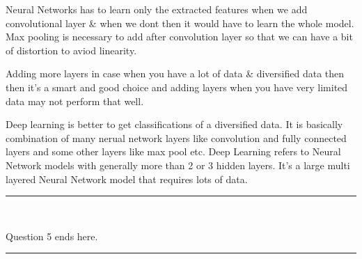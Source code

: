 \documentclass[paper=a4, fontsize=11pt]{scrartcl} %
\numberwithin{equation}{section} %
\numberwithin{figure}{section} %
\numberwithin{table}{section} %
\newcommand{\horrule}[1]{\rule{\linewidth}{#1}} %
\begin{document}
Neural Networks has to learn only the extracted features when we add convolutional  layer \& when we dont then it would have to learn the whole model.
Max pooling is necessary to add after convolution layer so that we can have a bit of distortion to aviod linearity.

Adding more layers in case when you have a lot of data \& diversified data then then it's a smart and good choice and adding layers when you have very limited data may not perform that well.

 Deep learning is better to get classifications of a diversified data. It is basically combination of many nerual network layers like convolution and fully connected layers and some other layers like max pool etc. Deep Learning refers to Neural Network models with generally more than 2 or 3 hidden layers. It's a large multi layered Neural Network model that requires lots of data.

\horrule{0.5pt} \\
\begin{center}
Question 5 ends here.
\horrule{2pt} \\
\end{center}
\pagebreak


\end{document}
